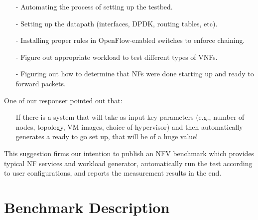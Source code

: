 \documentclass{sig-alternate-10pt}
\begin{document}
\begin{itemize}
\item[-]{}
Automating the process of setting up the testbed. 
\item[-]{}
Setting up the datapath (interfaces, DPDK, routing tables, etc).
\item[-]{}
Installing proper rules in OpenFlow-enabled switches to enforce chaining.
\item[-]{}
Figure out appropriate workload to test different types of VNFs.
\item[-]{}
Figuring out how to determine that NFs were done starting up and ready to forward packets. 
\end{itemize}

%
%
%
%

One of our responser pointed out that:
\begin{itemize}
\item[]{}
If there is a system that will take as input key parameters (e.g., number of nodes, topology, VM images, choice of hypervisor) and then automatically generates a ready to go set up, that will be of a huge value!
\end{itemize}
This suggestion firms our intention to publish an NFV benchmark 
which provides typical NF services and workload generator, 
automatically run the test according to user configurations, 
and  reports the measurement results in the end.


\section{ Benchmark Description}
\end{document}
